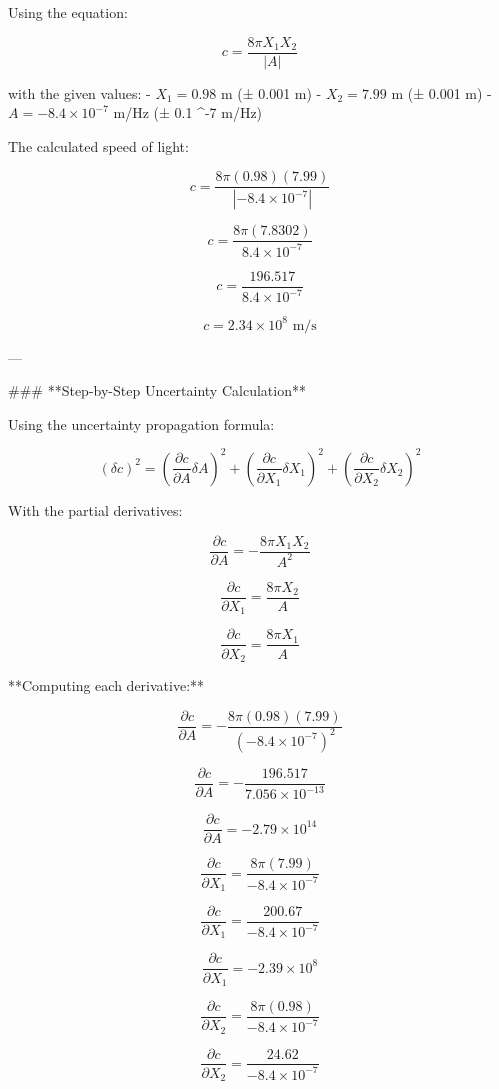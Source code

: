 Using the equation:

\[
c = \frac{8\pi X_1 X_2}{|A|}
\]

with the given values:  
- \( X_1 = 0.98 \) m (± 0.001 m)  
- \( X_2 = 7.99 \) m (± 0.001 m)  
- \( A = -8.4 \times 10^{-7} \) m/Hz (± 0.1 ^{-7} \) m/Hz)  

The calculated speed of light:

\[
c = \frac{8\pi (0.98) (7.99)}{| -8.4 \times 10^{-7} |}
\]

\[
c = \frac{8\pi (7.8302)}{8.4 \times 10^{-7}}
\]

\[
c = \frac{196.517}{8.4 \times 10^{-7}}
\]

\[
c = 2.34 \times 10^8 \text{ m/s}
\]

---

### **Step-by-Step Uncertainty Calculation**  

Using the uncertainty propagation formula:

\[
(\delta c)^2 = \left(\frac{\partial c}{\partial A} \delta A \right)^2 + \left(\frac{\partial c}{\partial X_1} \delta X_1 \right)^2 + \left(\frac{\partial c}{\partial X_2} \delta X_2 \right)^2
\]

With the partial derivatives:

\[
\frac{\partial c}{\partial A} = - \frac{8\pi X_1 X_2}{A^2}
\]

\[
\frac{\partial c}{\partial X_1} = \frac{8\pi X_2}{A}
\]

\[
\frac{\partial c}{\partial X_2} = \frac{8\pi X_1}{A}
\]

**Computing each derivative:**  

\[
\frac{\partial c}{\partial A} = - \frac{8\pi (0.98) (7.99)}{(-8.4 \times 10^{-7})^2}
\]

\[
\frac{\partial c}{\partial A} = - \frac{196.517}{7.056 \times 10^{-13}}
\]

\[
\frac{\partial c}{\partial A} = -2.79 \times 10^{14}
\]

\[
\frac{\partial c}{\partial X_1} = \frac{8\pi (7.99)}{-8.4 \times 10^{-7}}
\]

\[
\frac{\partial c}{\partial X_1} = \frac{200.67}{-8.4 \times 10^{-7}}
\]

\[
\frac{\partial c}{\partial X_1} = -2.39 \times 10^8
\]

\[
\frac{\partial c}{\partial X_2} = \frac{8\pi (0.98)}{-8.4 \times 10^{-7}}
\]

\[
\frac{\partial c}{\partial X_2} = \frac{24.62}{-8.4 \times 10^{-7}}
\]


